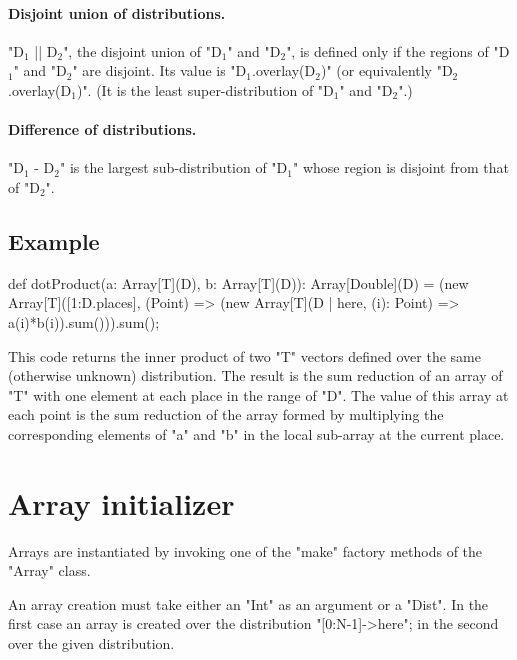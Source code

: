 \paragraph{Disjoint union of distributions.}
\xcdmath"D$_1$ || D$_2$", the disjoint union of \xcdmath"D$_1$"
and \xcdmath"D$_2$", is defined only if the regions of
\xcdmath"D$_1$" and \xcdmath"D$_2$" are disjoint. Its value is
\xcdmath"D$_1$.overlay(D$_2$)" (or equivalently
\xcdmath"D$_2$.overlay(D$_1$)".  (It is the least
super-distribution of \xcdmath"D$_1$" and \xcdmath"D$_2$".)

\paragraph{Difference of distributions.}
\xcdmath"D$_1$ - D$_2$" is the largest sub-distribution of
\xcdmath"D$_1$" whose region is disjoint from that of
\xcdmath"D$_2$".


\subsection{Example}
\begin{xten}
def dotProduct(a: Array[T](D), b: Array[T](D)): Array[Double](D) =
  (new Array[T]([1:D.places],
      (Point) => (new Array[T](D | here,
                    (i): Point) => a(i)*b(i)).sum())).sum();
\end{xten}

This code returns the inner product of two \xcd"T" vectors defined
over the same (otherwise unknown) distribution. The result is the sum
reduction of an array of \xcd"T" with one element at each place in the
range of \xcd"D". The value of this array at each point is the sum
reduction of the array formed by multiplying the corresponding
elements of \xcd"a" and \xcd"b" in the local sub-array at the current
place.




\section{Array initializer}\label{ArrayInitializer}\label{array!creation}

Arrays are instantiated by invoking one of the \xcd"make" factory
methods of the \xcd"Array" class.

An array creation 
must take either an \xcd"Int" as an argument or a \xcd"Dist". In the first
case an array is created over the distribution \xcd"[0:N-1]->here";
in the second over the given distribution. 

